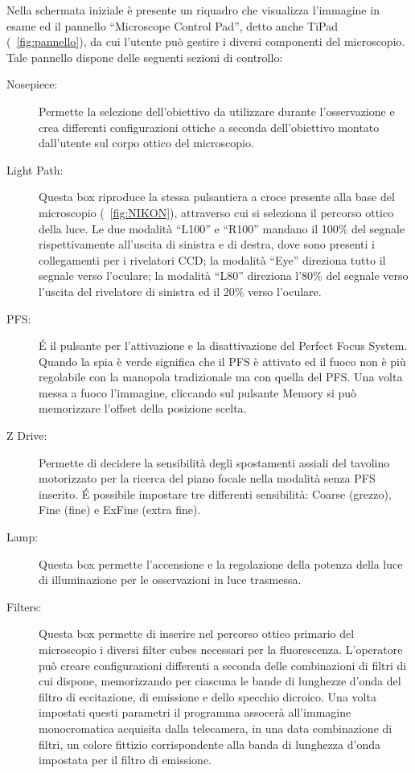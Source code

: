 Nella schermata iniziale è presente un riquadro che visualizza l'immagine in esame ed il pannello ``Microscope Control Pad'', detto anche TiPad (\figurename~\ref{fig:pannello}), da cui l'utente può gestire i diversi componenti del microscopio. 
Tale pannello dispone delle seguenti sezioni di controllo:

\begin{description}
\item[Nosepiece:]
Permette la selezione dell'obiettivo da utilizzare durante l'osservazione e crea differenti configurazioni ottiche a seconda dell'obiettivo montato dall'utente sul corpo ottico del microscopio.

\item[Light Path:]
Questa box riproduce la stessa pulsantiera a croce presente alla base del microscopio (\figurename~\ref{fig:NIKON}), attraverso cui si seleziona il percorso ottico della luce. 
Le due modalità ``L100'' e ``R100'' mandano il 100\% del segnale rispettivamente all'uscita di sinistra e di destra, dove sono presenti i collegamenti per i rivelatori CCD; la modalità ``Eye'' direziona tutto il segnale verso l'oculare; la modalità ``L80'' direziona l'80\% del segnale verso l'uscita del rivelatore di sinistra ed il 20\% verso l'oculare.

\item[PFS:]
\'E il pulsante per l'attivazione e la disattivazione del Perfect Focus System. 
Quando la spia è verde significa che il PFS è attivato ed il fuoco non è più regolabile con la manopola tradizionale ma con quella del PFS. 
Una volta messa a fuoco l'immagine, cliccando sul pulsante Memory si può memorizzare l'offset della posizione scelta.

\item[Z Drive:]
Permette di decidere la sensibilità degli spostamenti assiali del tavolino motorizzato per la ricerca del piano focale nella modalità senza PFS inserito.
\'E possibile impostare tre differenti sensibilità: Coarse (grezzo), Fine (fine) e ExFine (extra fine).

\item[Lamp:]
Questa box permette l'accensione e la regolazione della potenza della luce di illuminazione per le osservazioni in luce trasmessa.

\item[Filters:]
Questa box permette di inserire nel percorso ottico primario del microscopio i diversi filter cubes necessari per la fluorescenza.
L'operatore può creare configurazioni differenti a seconda delle combinazioni di filtri di cui dispone, memorizzando per ciascuna le bande di lunghezze d'onda del filtro di eccitazione, di emissione e dello specchio dicroico.
Una volta impostati questi parametri il programma assocerà all'immagine monocromatica acquisita dalla telecamera, in una data combinazione di filtri, un colore fittizio corrispondente alla banda di lunghezza d'onda impostata per il filtro di emissione.
\end{description}

